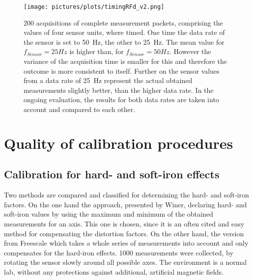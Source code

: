 \begin{figure}[h]
\centering
\texttt{[image: pictures/plots/timingRFd\_v2.png]}
\caption{200 acquisitions of complete measurement packets, comprising the values of four sensor units, where timed. One time the data rate of the sensor is set to \SI{50}{\Hz}, the other to \SI{25}{\Hz}. The mean value for $ f_{Sensor}=25\si{Hz} $ is higher than, for $ f_{Sensor}=50\si{Hz} $. However the variance of the acquisition time is smaller for this and therefore the outcome is more consistent to itself. Further on the sensor values from a data rate of \SI{25}{\Hz} represent the actual obtained measurements slightly better, than the higher data rate. In the ongoing evaluation, the results for both data rates are taken into account and compared to each other.}
\label{fig:sensTime}
\end{figure}




\section{Quality of calibration procedures} \label{sec:cali}

\subsection{Calibration for hard- and soft-iron effects}\label{subsec:resHardSoft}

Two methods are compared and classified for determining the hard- and soft-iron factors. On the one hand the approach, presented by Winer, declaring hard- and soft-iron values by using the maximum and minimum of the obtained measurements for an axis. This one is chosen, since it is an often cited and easy method for compensating the distortion factors. On the other hand, the version from Freescale \cite{ozyagcilar2012calibrating} which takes a whole series of measurements into account and only compensates for the hard-iron effects. 1000 measurements were collected, by rotating the sensor slowly around all possible axes. The environment is a normal lab, without any protections against additional, artificial magnetic fields. 

